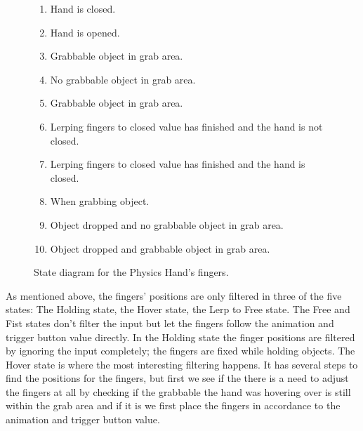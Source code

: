 
\begin{figure}[H]
\centering
{}
\begin{enumerate}[noitemsep]
\small
\item Hand is closed.
\item Hand is opened.
\item Grabbable object in grab area.
\item No grabbable object in grab area.
\item Grabbable object in grab area.
\item Lerping fingers to closed value has finished and the hand is not closed.
\item Lerping fingers to closed value has finished and the hand is closed.
\item When grabbing object.
\item Object dropped and no grabbable object in grab area.
\item Object dropped and grabbable object in grab area.
\end{enumerate}
\caption{State diagram for the Physics Hand's fingers.}
\label{fig:physicsHandStateDiagram}
\end{figure}

As mentioned above, the fingers' positions are only filtered in three of the five states: The Holding state, the Hover state, the Lerp to Free state. The Free and Fist states don't filter the input but let the fingers follow the animation and trigger button value directly. In the Holding state the finger positions are filtered by ignoring the input completely; the fingers are fixed while holding objects. The Hover state is where the most interesting filtering happens. It has several steps to find the positions for the fingers, but first we see if the there is a need to adjust the fingers at all by checking if the grabbable the hand was hovering over is still within the grab area and if it is we first place the fingers in accordance to the animation and trigger button value.

